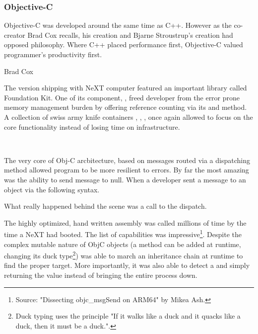\par
\subsubsection{Objective-C}
Objective-C was developed around the same time as C++. However as the co-creator Brad Cox recalls, his creation and Bjarne Stroustrup's creation had opposed philosophy. Where C++ placed performance first, Objective-C valued programmer's productivity first.\\
\par
{} {Brad Cox}\\
\par


\par
The version shipping with NeXT computer featured an important library called Foundation Kit. One of its component, , freed developer from the error prone memory management burden by offering reference counting via its  and  method. A collection of swiss army knife containers , , ,  once again allowed to focus on the core functionality instead of losing time on infrastructure.\\
\par
{}\\
\par
The very core of Obj-C arcbitecture, based on messages routed via a dispatching method  allowed program to be more resilient to errors. By far the most amazing was the ability to send message to null. When a developer sent a message to an object via the following syntax.\\ \par
{}
What really happened behind the scene was a call to the dispatch.\\
\par
{}
The highly optimized, hand written assembly was called millions of time by the time a NeXT had booted. The list of capabilities was impressive\footnote{Source: "Dissecting objc\_msgSend on ARM64" by Mikea Ash.}. Despite the complex mutable nature of ObjC objects (a method can be added at runtime, changing its duck type\footnote{Duck typing uses the principle "If it walks like a duck and it quacks like a duck, then it must be a duck.".})  was able to march an inheritance chain at runtime to find the proper target. More importantly, it was also able to detect a  and simply returning the value  instead of bringing the entire process down.\\
\par

